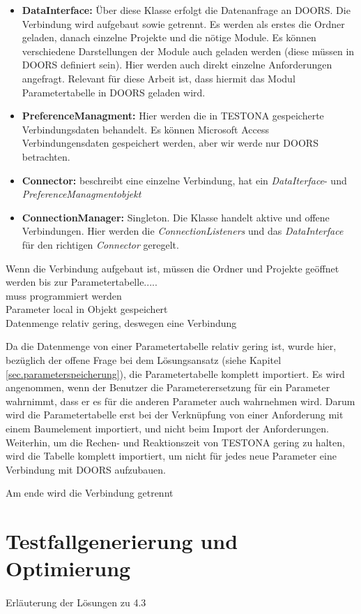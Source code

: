 \begin{itemize}
\item \textbf{DataInterface: }Über diese Klasse erfolgt die Datenanfrage an DOORS. Die Verbindung wird aufgebaut sowie getrennt. Es werden als erstes die Ordner geladen, danach einzelne Projekte und die nötige Module. Es können verschiedene Darstellungen der Module auch geladen werden (diese müssen in DOORS definiert sein). Hier werden auch direkt einzelne Anforderungen angefragt. Relevant für diese Arbeit ist, dass hiermit das Modul Parametertabelle in DOORS geladen wird.
\item \textbf{PreferenceManagment: } Hier werden die in TESTONA gespeicherte Verbindungsdaten behandelt. Es können Microsoft Access Verbindungensdaten gespeichert werden, aber wir werde nur DOORS betrachten.
\item \textbf{Connector: }beschreibt eine einzelne Verbindung, hat ein \textit{DataIterface}- und \textit{PreferenceManagmentobjekt}
\item \textbf{ConnectionManager: }Singleton. Die Klasse handelt aktive und offene Verbindungen. Hier werden die \textit{ConnectionListeners} und das \textit{DataInterface} für den richtigen \textit{Connector} geregelt.
\end{itemize}

Wenn die Verbindung aufgebaut ist, müssen die Ordner und Projekte geöffnet werden bis zur Parametertabelle.....\\

muss programmiert werden\\

Parameter local in Objekt gespeichert\\
Datenmenge relativ gering, deswegen eine Verbindung 

Da die Datenmenge von einer Parametertabelle relativ gering ist, wurde hier, bezüglich der offene Frage bei dem Lösungsansatz (siehe Kapitel \ref{sec.parameterspeicherung}), die Parametertabelle komplett importiert. Es wird angenommen, wenn der Benutzer die Parameterersetzung für ein Parameter wahrnimmt, dass er es für die anderen Parameter auch wahrnehmen wird. Darum wird die Parametertabelle erst bei der Verknüpfung von einer Anforderung mit einem Baumelement importiert, und nicht beim Import der Anforderungen. Weiterhin, um die Rechen- und Reaktionszeit von TESTONA gering zu halten, wird die Tabelle komplett importiert, um nicht für jedes neue Parameter eine Verbindung mit DOORS aufzubauen.


Am ende wird die Verbindung getrennt\\




\newpage
\section{Testfallgenerierung und Optimierung}
\paragraph{}
Erläuterung der Lösungen zu 4.3